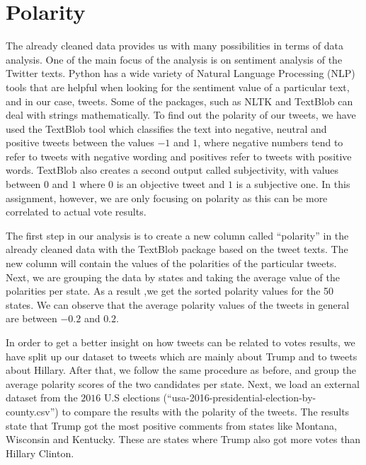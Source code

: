 \documentclass{article}
\begin{document}
      
  \section{Polarity}
  The already cleaned data provides us with many possibilities in
  terms of data analysis. One of the main focus of the analysis is on
  sentiment analysis of the Twitter texts. Python has a wide variety
  of Natural Language Processing (NLP) tools that are helpful when
  looking for the sentiment value of a particular text, and in our
  case, tweets. Some of the packages, such as NLTK and TextBlob can
  deal with strings mathematically. To find out the polarity of our
  tweets, we have used the TextBlob tool which classifies the text
  into negative, neutral and positive tweets between the values $-1$ and
  $1$, where negative numbers tend to refer to tweets with negative
  wording and positives refer to tweets with positive words. TextBlob
  also creates a second output called subjectivity, with values
  between $0$ and $1$  where $0$ is an objective tweet and $1$ is a subjective
  one. In this assignment, however, we are only focusing on polarity
  as this can be more correlated to actual vote results.%

  The first step in our analysis is to create a new column called
  “polarity” in the already cleaned data with the TextBlob package
  based on the tweet texts. The new column will contain the values of
  the polarities of the particular tweets. Next, we are grouping the
  data by states and taking the average value of the polarities per
  state. As a result ,we get the sorted polarity values for the 50
  states. We can observe that the average polarity values of the
  tweets in general are between $-0.2$ and $0.2$.

  In order to get a better insight on how tweets can be related to
  votes results, we have split up our dataset to tweets which are
  mainly about Trump and to tweets about Hillary. After that, we
  follow the same procedure as before, and group the average polarity
  scores of the two candidates per state. Next, we load an external
  dataset from the $2016$ U.S elections
  (“usa-2016-presidential-election-by-county.csv”) to compare the
  results with the polarity of the tweets. The results state that
  Trump got the most positive comments from states like Montana,
  Wisconsin and Kentucky. These are states where Trump also got more
  votes than Hillary Clinton.  
  
\end{document}
